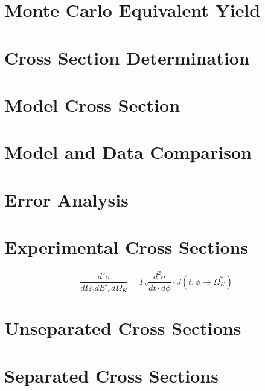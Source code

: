 \documentclass[
]{report}
\begin{document}
\hypertarget{Section-7.3}{%
\section{Monte Carlo Equivalent Yield}\label{Section-7.3}}

\hypertarget{Section-7.4}{%
\section{Cross Section Determination}\label{Section-7.4}}

\hypertarget{Section-7.5}{%
\section{Model Cross Section}\label{Section-7.5}}

\hypertarget{Section-7.6}{%
\section{Model and Data Comparison}\label{Section-7.6}}

\hypertarget{Section-7.7}{%
\section{Error Analysis}\label{Section-7.7}}

\label{Chapter-8}

\hypertarget{Section-8.1}{%
\section{Experimental Cross Sections}\label{Section-8.1}}

\begin{equation} 
  \frac{d^5\sigma}{d\Omega_e dE'_e d\Omega_K}=\Gamma_{\nu}\frac{d^2\sigma}{dt\cdot d\phi}\cdot J(t,\phi\rightarrow\Omega^*_K)
  \label{eq:sig_orderfive_virtual_physics} 
\end{equation}

\hypertarget{Section-8.2}{%
\section{Unseparated Cross Sections}\label{Section-8.2}}

\hypertarget{Section-8.3}{%
\section{Separated Cross Sections}\label{Section-8.3}}
\end{document}
